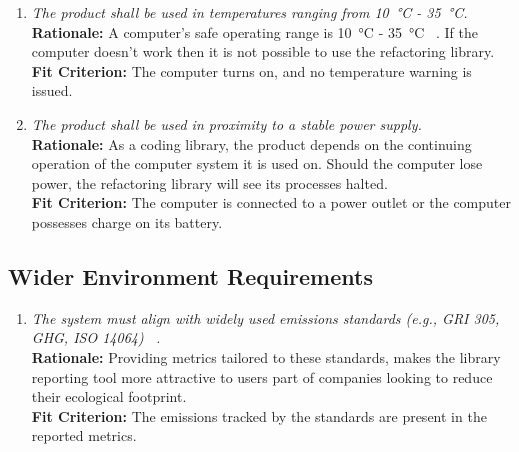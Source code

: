 \documentclass[12pt]{article}
\begin{document}
\begin{enumerate}[label=OER-EP \arabic*., wide=0pt, leftmargin=*]
	\item \emph{The product shall be used in temperatures ranging from \SI{10}{\celsius} - \SI{35}{\celsius}.}\\
    {\bf Rationale:} A computer's safe operating range is \SI{10}{\celsius} - \SI{35}{\celsius} ~\citep{PCTemp}. If the computer doesn't work then it is not possible to use the refactoring library. \\
    {\bf Fit Criterion:} The computer turns on, and no temperature warning is issued.
  \item \emph{The product shall be used in proximity to a stable power supply.}\\
  {\bf Rationale:} As a coding library, the product depends on the continuing operation of the computer system it is used on. Should the computer lose power, the refactoring library will see its processes halted. \\
  {\bf Fit Criterion:} The computer is connected to a power outlet or the computer possesses charge on its battery. 
\end{enumerate}

\subsection{Wider Environment Requirements}
\begin{enumerate}[label=OER-WE \arabic*., wide=0pt, leftmargin=*]
	\item \emph{The system must align with widely used emissions standards (e.g., GRI 305, GHG, ISO 14064) ~\citep{GHG,ISO14064,GRI305}.}\\
    {\bf Rationale:} Providing metrics tailored to these standards, makes the library reporting tool more attractive to users part of companies looking to reduce their ecological footprint. \\
    {\bf Fit Criterion:} The emissions tracked by the standards are present in the reported metrics.  
\end{enumerate}
\end{document}
